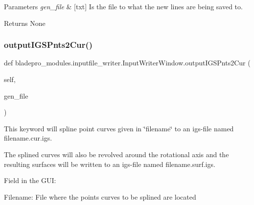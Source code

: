 \begin{DoxyParams}{Parameters}
{\em gen\+\_\+file} & \mbox{[}txt\mbox{]} Is the file to what the new lines are being saved to. \\
\hline
\end{DoxyParams}
\begin{DoxyReturn}{Returns}
None 
\end{DoxyReturn}
\hypertarget{classbladepro__modules_1_1inputfile__writer_1_1_input_writer_window_a60dc6e0ccec5f096ee68f997079abef3}{}\label{classbladepro__modules_1_1inputfile__writer_1_1_input_writer_window_a60dc6e0ccec5f096ee68f997079abef3} 
\subsubsection{\texorpdfstring{output\+I\+G\+S\+Pnts2\+Cur()}{outputIGSPnts2Cur()}}
{\footnotesize\ttfamily def bladepro\+\_\+modules.\+inputfile\+\_\+writer.\+Input\+Writer\+Window.\+output\+I\+G\+S\+Pnts2\+Cur (\begin{DoxyParamCaption}\item[{}]{self,  }\item[{}]{gen\+\_\+file }\end{DoxyParamCaption})}



This keyword will spline point curves given in \char`\"{}filename\char`\"{} to an igs-\/file named filename.\+cur.\+igs. 

The splined curves will also be revolved around the rotational axis and the resulting surfaces will be written to an igs-\/file named filename.\+surf.\+igs.

Field in the G\+UI\+: \begin{DoxyItemize}
\item {\ttfamily Filename\+:} File where the points curves to be splined are located\end{DoxyItemize}

